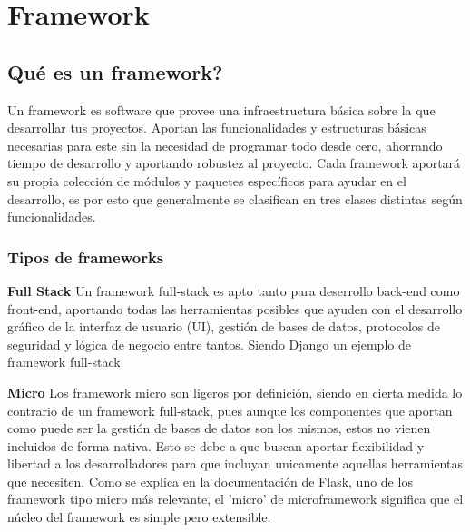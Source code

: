 \section{Framework}

\subsection{Qué es un framework?}
Un framework es software que provee una infraestructura básica sobre la que desarrollar tus proyectos. Aportan las funcionalidades y estructuras básicas necesarias para este sin la necesidad de programar todo desde cero, ahorrando tiempo de desarrollo y aportando robustez al proyecto. \cite{ghimire2020comparative}
\newline
\newline
Cada framework aportará su propia colección de módulos y paquetes específicos para ayudar en el desarrollo, es por esto que generalmente se clasifican en tres clases distintas según funcionalidades. \cite{WebFra}

\subsubsection{Tipos de frameworks}
\textbf{Full Stack}
\newline
Un framework full-stack es apto tanto para deserrollo back-end como front-end, aportando todas las herramientas posibles que ayuden con el desarrollo gráfico de la interfaz de usuario (UI), gestión de bases de datos, protocolos de seguridad y lógica de negocio entre tantos. Siendo Django un ejemplo de framework full-stack. 
\newline
\newline

\textbf{Micro}
\newline
Los framework micro son ligeros por definición, siendo en cierta medida lo contrario de un framework full-stack, pues aunque los componentes que aportan como puede ser la gestión de bases de datos son los mismos, estos no vienen incluidos de forma nativa. Esto se debe a que buscan aportar flexibilidad y libertad a los desarrolladores para que incluyan unicamente aquellas herramientas que necesiten. 
\newline
\newline
Como se explica en la documentación de Flask, uno de los framework tipo micro más relevante, el 'micro' de microframework significa que el núcleo del framework es simple pero extensible.
\newline
\newline


